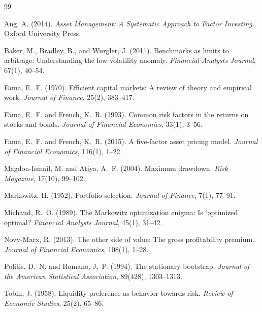 \documentclass[12pt, letterpaper]{article}
\begin{document}
\newpage
\begin{thebibliography}{99}

Ang, A. (2014).
\textit{Asset Management: A Systematic Approach to Factor Investing}.
Oxford University Press.

Baker, M., Bradley, B., and Wurgler, J. (2011).
Benchmarks as limits to arbitrage: Understanding the low-volatility anomaly.
\textit{Financial Analysts Journal}, 67(1), 40--54.

Fama, E.~F. (1970).
Efficient capital markets: A review of theory and empirical work.
\textit{Journal of Finance}, 25(2), 383--417.

Fama, E.~F. and French, K.~R. (1993).
Common risk factors in the returns on stocks and bonds.
\textit{Journal of Financial Economics}, 33(1), 3--56.

Fama, E.~F. and French, K.~R. (2015).
A five-factor asset pricing model.
\textit{Journal of Financial Economics}, 116(1), 1--22.

Magdon-Ismail, M. and Atiya, A.~F. (2004).
Maximum drawdown.
\textit{Risk Magazine}, 17(10), 99--102.

Markowitz, H. (1952).
Portfolio selection.
\textit{Journal of Finance}, 7(1), 77--91.

Michaud, R.~O. (1989).
The Markowitz optimization enigma: Is `optimized' optimal?
\textit{Financial Analysts Journal}, 45(1), 31--42.

Novy-Marx, R. (2013).
The other side of value: The gross profitability premium.
\textit{Journal of Financial Economics}, 108(1), 1--28.

Politis, D.~N. and Romano, J.~P. (1994).
The stationary bootstrap.
\textit{Journal of the American Statistical Association}, 89(428), 1303--1313.

Tobin, J. (1958).
Liquidity preference as behavior towards risk.
\textit{Review of Economic Studies}, 25(2), 65--86.

\end{thebibliography}
\end{document}
